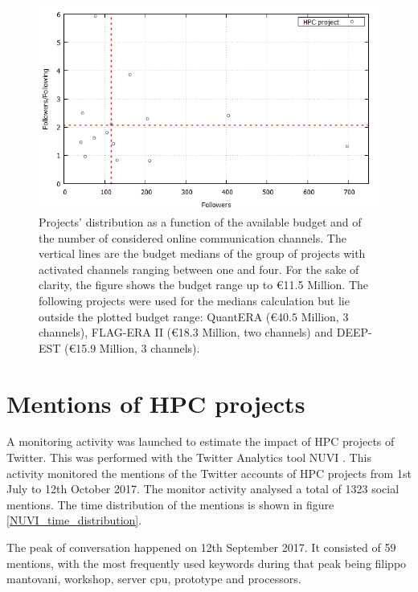 \begin{figure}[!t] 
 \begin{center}
 \includegraphics[scale=0.4]{Images/HPC_influence.png}
 \caption{Projects' distribution as a function of the available budget and of the number of considered online communication channels. The vertical lines are the budget medians of the group of projects with activated channels ranging between one and four. For the sake of clarity, the figure shows the budget range up to \euro 11.5 Million. The following projects were used for the medians calculation but lie outside the plotted budget range: QuantERA (\euro 40.5 Million, 3 channels), FLAG-ERA II (\euro 18.3 Million, two channels) and DEEP-EST (\euro 15.9 Million, 3 channels).}
 \label{HPC_influence_plot}
 \end{center}
\end{figure}

\section{Mentions of HPC projects}
A monitoring activity was launched to estimate the impact of HPC projects of Twitter. This was performed with the Twitter Analytics tool NUVI \cite{NUVI}. This activity monitored the mentions of the Twitter accounts of HPC projects from 1st July to 12th October 2017. The monitor activity analysed a total of 1323 social mentions. The time distribution of the mentions is shown in figure \ref{NUVI_time_distribution}.

The peak of conversation happened on 12th September 2017. It consisted of 59 mentions, with the most frequently used keywords during that peak being filippo mantovani, workshop, server cpu, prototype and processors.

